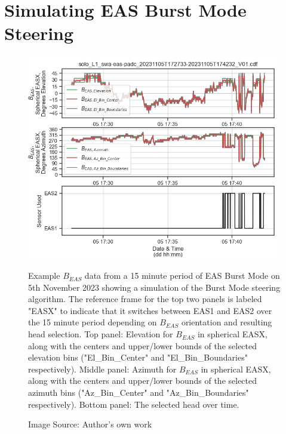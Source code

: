 \section{Simulating EAS Burst Mode Steering} \label{sim steering}

\begin{figure}[h!]
    \centering
    \centerfloat
    \includegraphics[width=1.05\linewidth]{figures/Steering Example.png}
    \caption{Example \(B_{EAS}\) data from a 15 minute period of EAS Burst Mode on 5th November 2023 showing a simulation of the Burst Mode steering algorithm. The reference frame for the top two panels is labeled "EASX" to indicate that it switches between EAS1 and EAS2 over the 15 minute period depending on \(B_{EAS}\) orientation and resulting head selection. Top panel: Elevation for \(B_{EAS}\) in spherical EASX, along with the centers and upper/lower bounds of the selected elevation bins ("El\_Bin\_Center" and "El\_Bin\_Boundaries" respectively). Middle panel: Azimuth for \(B_{EAS}\) in spherical EASX, along with the centers and upper/lower bounds of the selected azimuth bins ("Az\_Bin\_Center" and "Az\_Bin\_Boundaries" respectively). Bottom panel: The selected head over time.}
    \caption*{Image Source: Author's own work}
    \label{fig: steering example november}
\end{figure}

